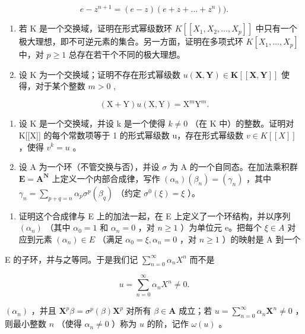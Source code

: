 \[
e - z ^ {n + 1} = (e - z) (e + z + \dots + z ^ {n})).
\]

\begin{enumerate}
\def\labelenumi{\arabic{enumi}.}
\setcounter{enumi}{21}
\item
  若 K 是一个交换域，证明在形式幂级数环 \(K[[X_{1}, X_{2}, \ldots, X_{p}]]\) 中只有一个极大理想，即不可逆元素的集合。另一方面，证明在多项式环 \(K[X_{1}, \ldots, X_{p}]\) 中，对 \(p \geqslant 1\) 总存在若干个不同的极大理想。
\item
  设 K 为一个交换域；证明不存在形式幂级数 \(u(\mathbf{X}, \mathbf{Y}) \in \mathbf{K}[[\mathbf{X}, \mathbf{Y}]]\) 使得，对于某个整数 \(m > 0\) ,
\end{enumerate}

\[
(\mathrm{X} + \mathrm{Y}) u (\mathrm{X}, \mathrm{Y}) = \mathrm{X} ^ {m} \mathrm{Y} ^ {m}.
\]

\begin{enumerate}
\def\labelenumi{\arabic{enumi}.}
\setcounter{enumi}{23}
\item
  设 K 是一个交换域，并设 k 是一个使得 \(k \neq 0\) （在 K 中）的整数。证明对 K{[}{[}X{]}{]} 的每个常数项等于 1 的形式幂级数 u，存在形式幂级数 \(v \in K[[X]]\) ，使得 \(v^{k} = u\) 。
\item
  设 A 为一个环（不管交换与否），并设 \(\sigma\) 为 A 的一个自同态。在加法乘积群 \(\mathbf{E} = \mathbf{A}^{\mathbf{N}}\) 上定义一个内部合成律，写作 \((\alpha_{n})(\beta_{n}) = (\gamma_{n})\) ，其中 \(\gamma_{n} = \sum_{p + q = n}\alpha_{p}\sigma^{p}(\beta_{q})\) （约定 \(\sigma^0 (\xi) = \xi\) ）。
\end{enumerate}

\begin{enumerate}
\def\labelenumi{(\alph{enumi})}
\tightlist
\item
  证明这个合成律与 E 上的加法一起，在 E 上定义了一个环结构，并以序列 \((\alpha_{n})\) （其中 \(\alpha_{0}=1\) 和 \(\alpha_{n}=0\) ，对 \(n\geqslant1\) ）为单位元 e。把每个 \(\xi\in A\) 对应到元素 \((\alpha_{n})\in E\) （满足 \(\alpha_{0}=\xi,\alpha_{n}=0\) ，对 \(n\geqslant1\) ）的映射是 A 到一个
\end{enumerate}

E 的子环，并与之等同。于是我们记 \(\sum_{n=0}^{\infty} \alpha_n X^n\) 而不是

\[
u = \sum_ {n = 0} ^ {\infty} \alpha_ {n} X ^ {n} \neq 0.
\]

\((\alpha_{n})\) ，并且 \(\mathbf{X}^{p}\beta = \sigma^{p}(\beta)\mathbf{X}^{p}\) 对所有 \(\beta \in \mathbf{A}\) 成立；若 \(u = \sum_{n=0}^{\infty} \alpha_{n}\mathbf{X}^{n} \neq 0\) ，则最小整数 \(n\) （使得 \(\alpha_{n} \neq 0\) ）称为 \(u\) 的阶，记作 \(\omega(u)\) 。

